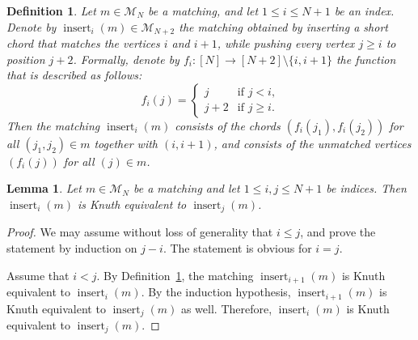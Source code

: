 \documentclass[11pt]{article}
\newtheorem{definition}[theo]{Definition}
\newtheorem{lemma}[theo]{Lemma}
\theoremstyle{definition}
\numberwithin{equation}{section}
\newcommand{\insrt}{\operatorname{insert}}
\newcommand{\M}{\mathcal{M}}
\begin{document}
\begin{definition}
\label{def:insert short chord to matching}
    Let $m \in \M_N$ be a matching, and let $1 \le i \le N+1$ be an index. Denote by $\insrt_i(m) \in \M_{N+2}$ the matching obtained by \emph{inserting a short chord} that matches the vertices $i$ and $i+1$, while pushing every vertex $j \ge i$ to position $j+2$. Formally, denote by $f_i:[N] \to [N+2]\setminus\{i,i+1\}$ the function that is described as follows:
    \[
        f_i(j) = \begin{cases}
			j & \text{if $j < i$,}\\
            j+2 & \text{if $j \ge i$.}
		 \end{cases}
    \]
    Then the matching $\insrt_i(m)$ consists of the chords $(f_i(j_1),f_i(j_2))$ for all $(j_1,j_2) \in m$ together with $(i,i+1)$, and consists of the unmatched vertices $(f_i(j))$ for all $(j) \in m$.
\end{definition}

\begin{lemma}
\label{lem:insert i equivalent insert j}
    Let $m \in \M_N$ be a matching and let $1 \le i,j \le N+1$ be indices. Then $\insrt_i(m)$ is Knuth equivalent to $\insrt_j(m)$.
\end{lemma}

\begin{proof}
    We may assume without loss of generality that $i \le j$, and prove the statement by induction on $j-i$. The statement is obvious for $i=j$.

    Assume that $i < j$. By Definition~\ref{def:insert short chord to matching}, the matching $\insrt_{i+1}(m)$ is Knuth equivalent to $\insrt_i(m)$. By the induction hypothesis, $\insrt_{i+1}(m)$ is Knuth equivalent to $\insrt_j(m)$ as well. Therefore, $\insrt_i(m)$ is Knuth equivalent to $\insrt_j(m)$.
\end{proof}
\end{document}
